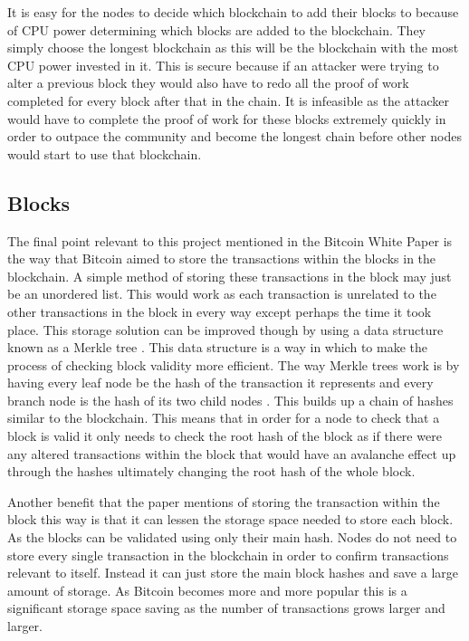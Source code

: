 \documentclass{l4proj}
\begin{document}
It is easy for the nodes to decide which blockchain to add their blocks to because of CPU power
determining which blocks are added to the blockchain. They simply choose the longest blockchain as this will be
the blockchain with the most CPU power invested in it. This is secure because if an attacker were trying to alter a 
previous block they would also have to redo all the proof of work completed for every block after that in the chain.
It is infeasible as the attacker would have to complete the proof of work for these blocks extremely quickly in order
to outpace the community and become the longest chain before other nodes would start to use that blockchain.


\subsection{Blocks}
\label{sec:blocks}
The final point relevant to this project mentioned in the Bitcoin White Paper is the way that Bitcoin aimed to store
the transactions within the blocks in the blockchain. A simple method of storing these transactions in the block may
just be an unordered list. This would work as each transaction is unrelated to the other transactions in the block in
every way except perhaps the time it took place. This storage solution can be improved though by using a data structure
known as a Merkle tree \citep{merkle1987digital}. This data structure is a way in which to make the process of checking block validity
more efficient. The way Merkle trees work is by having every leaf node be the hash of the transaction it represents 
and every branch node is the hash of its two child nodes . This builds up a chain of hashes similar to the blockchain.
This means that in order for a node to check that a block is valid it only needs to check the root hash of the block as
if there were any altered transactions within the block that would have an avalanche effect up through the hashes
ultimately changing the root hash of the whole block.

Another benefit that the paper mentions of storing the transaction within the block this way is that it can lessen
the storage space needed to store each block. As the blocks can be validated using only their main hash. Nodes do 
not need to store every single transaction in the blockchain in order to confirm transactions relevant to itself.
Instead it can just store the main block hashes and save a large amount of storage. As Bitcoin becomes more and
more popular this is a significant storage space saving as the number of transactions grows larger and larger.
\end{document}
